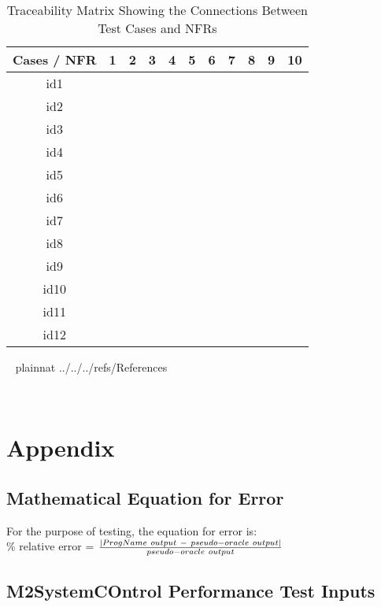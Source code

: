 \documentclass[12pt, titlepage]{article}
\begin{document}
\begin{table}[!h]
	\begin{center}
		\begin{tabular}{| c | c | c | c | c | c | c | c | c | c | c |}
			\hline
			Cases / NFR & 1 & 2 & 3 & 4 & 5 & 6 & 7 & 8 & 9 & 10\\
			\hline
			id1 & & & & & & & & & &\\
			\hline
			id2 & \checkmark& & & & & & & & &\\
			\hline
			id3 & & & & & & & & & &\\
			\hline
			id4 & & & & & & & & & &\\
			\hline
			id5 & & & & & & & & & &\\
			\hline
			id6 & & & & & & & & & &\\
			\hline
			id7 & & & & & & & & & &\\
			\hline
			id8 & \checkmark& & & & & & & & &\\
			\hline
			id9 & & & & & & & & & &\\
			\hline
			id10 & & & & & & & & & &\\
			\hline
			id11 & & & \checkmark& & & & & & &\\
			\hline
			id12 & & & & & & & & \checkmark& &\\
			\hline
		\end{tabular}
		\caption{Traceability Matrix Showing the Connections Between Test Cases and NFRs}
	\end{center}
\end{table}   

~\newpage
\clearpage
 {plainnat}
 {../../../refs/References}

~\newpage
\section{Appendix}
\subsection{Mathematical Equation for Error}
\label{eqerror}

For the purpose of testing, the equation for error is:\\

\% relative error = $\frac{ |{\progname}\ output\ -\ pseudo-oracle\ output| }{pseudo-oracle\ output}$

\subsection{M2SystemCOntrol Performance Test Inputs}
\label{M2SCPTI}
\end{document}
